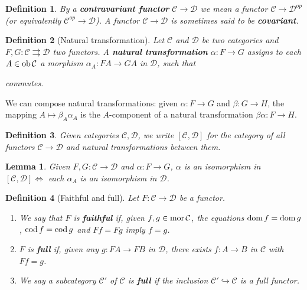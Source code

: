 \documentclass[a4paper]{article}
\newtheorem*{definition}{Definition}
\newtheorem{lemma}{Lemma}
\newcommand*\dom[1]{\textnormal{dom}\,#1}
\newcommand*\cod[1]{\textnormal{cod}\,#1}
\newcommand*\ob[1]{\textnormal{ob}\,#1}
\newcommand*\mor[1]{\textnormal{mor}\,#1}
\begin{document}
\begin{definition}
	By a \textbf{contravariant functor} $\mathcal{C} \to \mathcal{D}$ we mean a functor $\mathcal{C} \to \mathcal{D}^{op}$ (or equivalently $\mathcal{C}^{op} \to \mathcal{D}$). A functor $\mathcal{C} \to \mathcal{D}$ is sometimes said to be \textbf{covariant}.
\end{definition}

\begin{definition}[Natural transformation]
	Let $\mathcal{C}$ and $\mathcal{D}$ be two categories and $F, G: \mathcal{C} \rightrightarrows \mathcal{D}$ two functors. A \textbf{natural transformation} $\alpha:F\to G$ assigns to each $A \in \ob{\mathcal{C}}$ a morphism $\alpha_A:FA\to GA$ in $\mathcal{D}$, such that
	\begin{center}
	\end{center}
	commutes.
\end{definition}

We can compose natural transformations: given $\alpha: F \to G$ and $\beta: G \to H$, the mapping $A \mapsto \beta_A \alpha_A$ is the $A$-component of a natural transformation $\beta\alpha: F \to H$.

\begin{definition}
	Given categories $\mathcal{C}, \mathcal{D}$, we write $[\mathcal{C},\mathcal{D}]$ for the category of all functors $\mathcal{C} \to \mathcal{D}$ and natural transformations between them.
\end{definition}

\begin{lemma}
	Given $F,G: \mathcal{C} \to \mathcal{D}$ and $\alpha: F \to G$, $\alpha$ is an isomorphism in $[\mathcal{C}, \mathcal{D}] \iff$ each $\alpha_A$ is an isomorphism in $\mathcal{D}$.
\end{lemma}

\begin{definition}[Faithful and full]
	Let $F: \mathcal{C} \to \mathcal{D}$ be a functor.
	\begin{enumerate}[label=\alph*.]
		\item We say that $F$ is \textbf{faithful} if, given $f, g \in \mor{\mathcal{C}}$, the equations $\dom{f}=\dom{g}$, $\cod{f}=\cod{g}$ and $Ff = Fg$ imply $f=g$.
		\item $F$ is \textbf{full} if, given any $g: FA \to FB$ in $\mathcal{D}$, there exists $f: A \to B$ in $\mathcal{C}$ with $Ff =g$.
		\item We say a subcategory $\mathcal{C}'$ of $\mathcal{C}$ is \textbf{full} if the inclusion $\mathcal{C}' \hookrightarrow \mathcal{C}$ is a full functor.
	\end{enumerate}
\end{definition}
\end{document}
